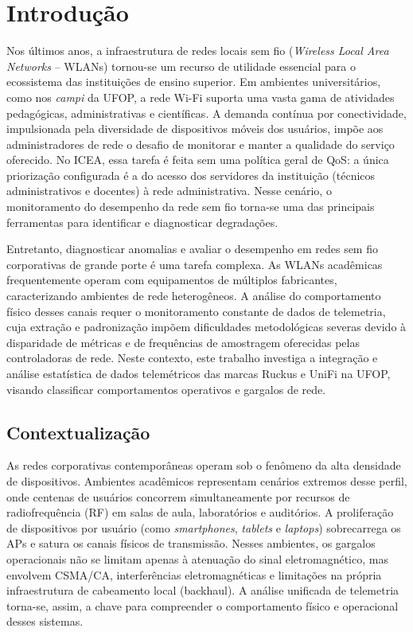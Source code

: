 \chapter{Introdução}
\label{cap:introducao}

Nos últimos anos, a infraestrutura de redes locais sem fio (\textit{Wireless Local Area Networks} -- WLANs) tornou-se um recurso de utilidade essencial para o ecossistema das instituições de ensino superior. Em ambientes universitários, como nos \textit{campi} da \ac{UFOP}, a rede Wi-Fi suporta uma vasta gama de atividades pedagógicas, administrativas e científicas. A demanda contínua por conectividade, impulsionada pela diversidade de dispositivos móveis dos usuários, impõe aos administradores de rede o desafio de monitorar e manter a qualidade do serviço oferecido. No \ac{ICEA}, essa tarefa é feita sem uma política geral de \ac{QoS}: a única priorização configurada é a do acesso dos servidores da instituição (técnicos administrativos e docentes) à rede administrativa. Nesse cenário, o monitoramento do desempenho da rede sem fio torna-se uma das principais ferramentas para identificar e diagnosticar degradações.

Entretanto, diagnosticar anomalias e avaliar o desempenho em redes sem fio corporativas de grande porte é uma tarefa complexa. As WLANs acadêmicas frequentemente operam com equipamentos de múltiplos fabricantes, caracterizando ambientes de rede heterogêneos. A análise do comportamento físico desses canais requer o monitoramento constante de dados de telemetria, cuja extração e padronização impõem dificuldades metodológicas severas devido à disparidade de métricas e de frequências de amostragem oferecidas pelas controladoras de rede. Neste contexto, este trabalho investiga a integração e análise estatística de dados telemétricos das marcas Ruckus e UniFi na \ac{UFOP}, visando classificar comportamentos operativos e gargalos de rede.

\section{Contextualização}
\label{sec:contextualizacao}

As redes corporativas contemporâneas operam sob o fenômeno da alta densidade de dispositivos. Ambientes acadêmicos representam cenários extremos desse perfil, onde centenas de usuários concorrem simultaneamente por recursos de radiofrequência (RF) em salas de aula, laboratórios e auditórios. A proliferação de dispositivos por usuário (como \textit{smartphones}, \textit{tablets} e \textit{laptops}) sobrecarrega os \acp{AP} e satura os canais físicos de transmissão. Nesses ambientes, os gargalos operacionais não se limitam apenas à atenuação do sinal eletromagnético, mas envolvem \ac{CSMA/CA}, interferências eletromagnéticas e limitações na própria infraestrutura de cabeamento local (backhaul). A análise unificada de telemetria torna-se, assim, a chave para compreender o comportamento físico e operacional desses sistemas.

